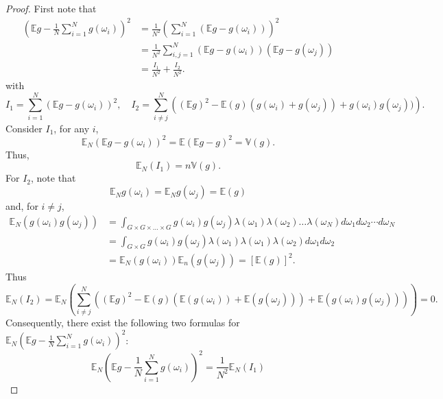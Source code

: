 \begin{proof}%
First note that
 \begin{equation}
    \label{eqn}
    \begin{aligned}
\left(\mathbb{E} g-\frac1N\sum_{i=1}^Ng(\omega_i)\right)^2 
  & 
=\frac{1}{N^2} \left(\sum_{i=1}^N(\mathbb{E} g-g(\omega_i))\right)^2 
  \\
  &=\frac{1}{N^2} \sum_{i,j=1}^N(\mathbb{E} g-g(\omega_i))(\mathbb{E} g-g(\omega_j))
  \\
  &=\frac{I_1}{N^2} +\frac{I_2}{N^2}.
    \end{aligned}
  \end{equation}
with 
\begin{equation}
I_1= \sum_{i=1}^N(\mathbb{E} g-g(\omega_i))^2,\quad I_2=\sum_{i\neq  j}^N\left ((\mathbb{E}g)^2-\mathbb {E}(g)(g(\omega_i)+
g(\omega_j))+g(\omega_i)g(\omega_j))\right).
\end{equation}
Consider $I_1$, for any $i$,
 $$
 \mathbb{E}_N(\mathbb{E} g-g(\omega_i))^2
 =\mathbb{E}(\mathbb{E} g-g)^2 = \mathbb{V}(g).
 $$ 
Thus,
$$
 \mathbb{E}_N (I_1) = n\mathbb{V}(g).
$$
For $I_2$, note that
$$
\mathbb E_N g(\omega_i)=\mathbb E_N g(\omega_j) =\mathbb E(g)
$$
and, for $i\neq j$,
\begin{equation}\label{key}
\begin{aligned}
\mathbb {E}_N ( g(\omega_i)g(\omega_j)) &= 
\int_{G\times G\times\ldots\times G}
g(\omega_i) g(\omega_j) \lambda(\omega_1) \lambda(\omega_2)\ldots \lambda(\omega_N)
d\omega_1d\omega_2\cdots d\omega_N \\
&= \int_{G\times G} g(\omega_i) g(\omega_j) \lambda(\omega_1) 
\lambda(\omega_1) \lambda(\omega_2)
d\omega_1d\omega_2 \\
&= \mathbb {E}_N (
g(\omega_i))\mathbb {E}_n(g(\omega_j))
=[\mathbb E(g)]^2.
\end{aligned}
\end{equation}
Thus
 \begin{equation}
\mathbb{E}_N (I_2) = \mathbb{E}_N \left( \sum_{i\neq j}^N((\mathbb{E}g)^2-\mathbb
  E(g)(\mathbb E(g(\omega_i))+ \mathbb E(g(\omega_j)))+\mathbb E(g(\omega_i)g(\omega_j))) \right)=0.
  \end{equation}
Consequently, there exist the following two formulas for $\displaystyle \mathbb{E}_N\left(\mathbb{E} g-
      \frac1N\sum_{i=1}^Ng(\omega_i)\right)^2$:
 \begin{equation} 
 \mathbb{E}_N\left(\mathbb{E} g-
      \frac1N\sum_{i=1}^Ng(\omega_i)\right)^2 = \frac{1}{N^2}\mathbb{E}_N (I_1)

\end{equation}
\end{proof}
